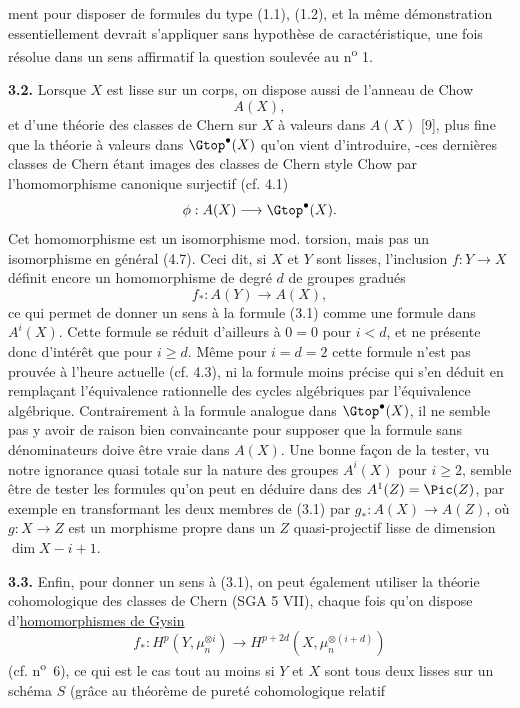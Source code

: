 
ment pour disposer de formules du type (1.1), (1.2), et la même démonstration essentiellement devrait s'appliquer sans hypothèse de caractéristique, une fois résolue dans un sens affirmatif la question soulevée au n\textsuperscript{o} 1.

\textbf{3.2.} Lorsque $X$ est lisse sur un corps, on dispose aussi de l'anneau de Chow
\[
 A(X),
\]
et d'une théorie des classes de Chern sur $X$ à valeurs dans $A(X)$ [9], plus fine que la théorie à valeurs dans $\Gtop^\bullet(X)$ qu'on vient d'introduire, -ces dernières classes de Chern étant images des classes de Chern style Chow par l'homomorphisme canonique surjectif (cf. 4.1)
\[
 \phi:A(X)\longrightarrow \Gtop^\bullet(X).
\]
Cet homomorphisme est un isomorphisme mod. torsion, mais pas un isomorphisme en général (4.7). Ceci dit, si $X$ et $Y$ sont lisses, l'inclusion $f:Y\to X$ définit encore un homomorphisme de degré $d$ de groupes gradués
\[
 f_*:A(Y)\longrightarrow A(X),
\]
ce qui permet de donner un sens à la formule (3.1) comme une formule dans $A^i(X)$. Cette formule se réduit d'ailleurs à $0=0$ pour $i<d$, et ne présente donc d'intérêt que pour $i\geq d$. Même pour $i=d=2$ cette formule n'est pas prouvée à l'heure actuelle (cf. 4.3), ni la formule moins précise qui s'en déduit en remplaçant l'équivalence rationnelle des cycles algébriques par l'équivalence algébrique. Contrairement à la formule analogue dans $\Gtop^\bullet(X)$, il ne semble pas y avoir de raison bien convaincante pour supposer que la formule sans dénominateurs doive être vraie dans $A(X)$. Une bonne façon de la tester, vu notre ignorance quasi totale sur la nature des groupes $A^i(X)$ pour $i\geq 2$, semble être de tester les formules qu'on peut en déduire dans des $A^1(Z)=\Pic(Z)$, par exemple en transformant les deux membres de (3.1) par $g_*:A(X)\longrightarrow A(Z)$, où $g:X\to Z$ est un morphisme propre dans un $Z$ quasi-projectif lisse de dimension $\dim X-i+1$.

\textbf{3.3.} Enfin, pour donner un sens à (3.1), on peut également utiliser la théorie cohomologique des classes de Chern (SGA 5 VII), chaque fois qu'on dispose d'\uline{homomorphismes de Gysin}
\[
 f_*:H^p(Y,\mu_n^{\otimes i})\longrightarrow H^{p+2d}(X,\mu_n^{\otimes(i+d)})
\]
(cf. n\textsuperscript{o}~6), ce qui est le cas tout au moins si $Y$ et $X$ sont tous deux lisses sur un schéma $S$ (grâce au théorème de pureté cohomologique relatif 

